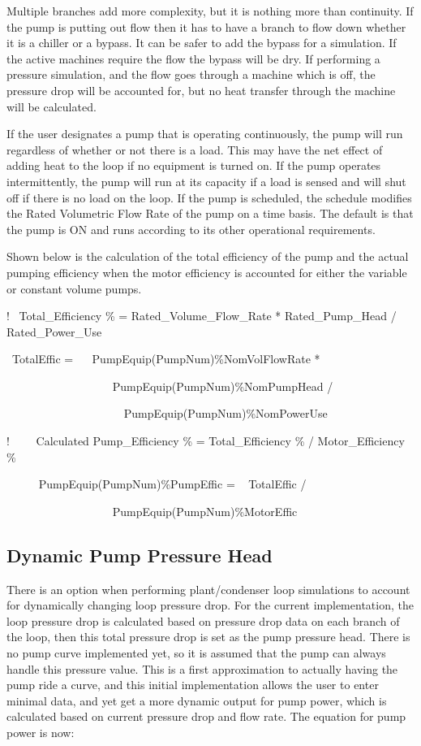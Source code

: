 Multiple branches add more complexity, but it is nothing more than continuity. If the pump is putting out flow then it has to have a branch to flow down whether it is a chiller or a bypass. It can be safer to add the bypass for a simulation. If the active machines require the flow the bypass will be dry. If performing a pressure simulation, and the flow goes through a machine which is off, the pressure drop will be accounted for, but no heat transfer through the machine will be calculated.

If the user designates a pump that is operating continuously, the pump will run regardless of whether or not there is a load. This may have the net effect of adding heat to the loop if no equipment is turned on. If the pump operates intermittently, the pump will run at its capacity if a load is sensed and will shut off if there is no load on the loop. If the pump is scheduled, the schedule modifies the Rated Volumetric Flow Rate of the pump on a time basis. The default is that the pump is ON and runs according to its other operational requirements.

Shown below is the calculation of the total efficiency of the pump and the actual pumping efficiency when the motor efficiency is accounted for either the variable or constant volume pumps.

!~ Total\_Efficiency \% = Rated\_Volume\_Flow\_Rate * Rated\_Pump\_Head / Rated\_Power\_Use

~TotalEffic = ~~ PumpEquip(PumpNum)\%NomVolFlowRate *

~~~~~~~~~~~~~~~~~~ PumpEquip(PumpNum)\%NomPumpHead /

~~~~~~~~~~~~~~~~~~~~ PumpEquip(PumpNum)\%NomPowerUse

!~~~~ Calculated Pump\_Efficiency \% = Total\_Efficiency \% / Motor\_Efficiency \%

~~~~~ PumpEquip(PumpNum)\%PumpEffic = ~ TotalEffic /

~~~~~~~~~~~~~~~~~~ PumpEquip(PumpNum)\%MotorEffic

\subsection{Dynamic Pump Pressure Head}\label{dynamic-pump-pressure-head}

There is an option when performing plant/condenser loop simulations to account for dynamically changing loop pressure drop. For the current implementation, the loop pressure drop is calculated based on pressure drop data on each branch of the loop, then this total pressure drop is set as the pump pressure head. There is no pump curve implemented yet, so it is assumed that the pump can always handle this pressure value. This is a first approximation to actually having the pump ride a curve, and this initial implementation allows the user to enter minimal data, and yet get a more dynamic output for pump power, which is calculated based on current pressure drop and flow rate. The equation for pump power is now:

